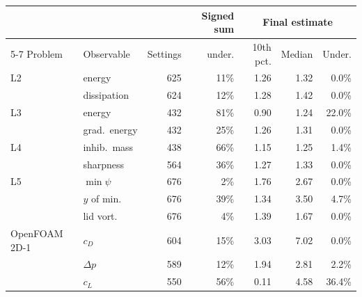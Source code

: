 \begin{tabular}{llrrrrr}
\toprule
& & & Signed sum & \multicolumn{3}{c}{Final estimate} \\
\cmidrule(lr){5-7}
Problem & Observable & Settings & under. & 10th pct. & Median & Under. \\
\midrule
L2 & energy & 625 & 11\% & 1.26 & 1.32 & 0.0\% \\
 & dissipation & 624 & 12\% & 1.28 & 1.42 & 0.0\% \\
L3 & energy & 432 & 81\% & 0.90 & 1.24 & 22.0\% \\
 & grad.\ energy & 432 & 25\% & 1.26 & 1.31 & 0.0\% \\
L4 & inhib.\ mass & 438 & 66\% & 1.15 & 1.25 & 1.4\% \\
 & sharpness & 564 & 36\% & 1.27 & 1.33 & 0.0\% \\
L5 & $\min\psi$ & 676 & 2\% & 1.76 & 2.67 & 0.0\% \\
 & $y$ of min. & 676 & 39\% & 1.34 & 3.50 & 4.7\% \\
 & lid vort. & 676 & 4\% & 1.39 & 1.67 & 0.0\% \\
OpenFOAM 2D-1 & $c_D$ & 604 & 15\% & 3.03 & 7.02 & 0.0\% \\
 & $\Delta p$ & 589 & 12\% & 1.94 & 2.81 & 2.2\% \\
 & $c_L$ & 550 & 56\% & 0.11 & 4.58 & 36.4\% \\
\bottomrule
\end{tabular}